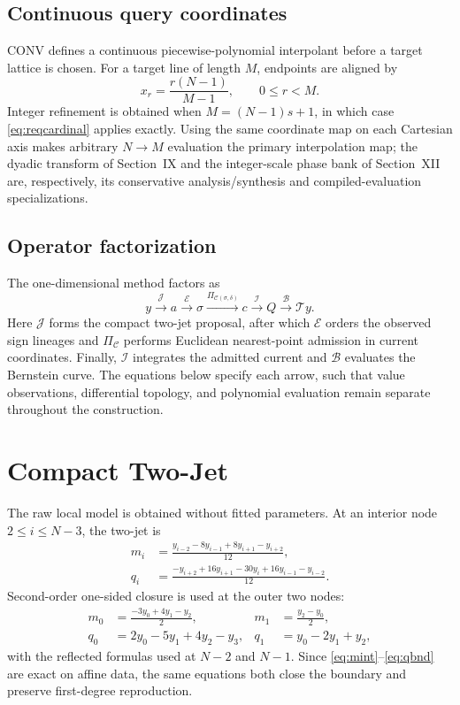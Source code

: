 \documentclass[journal]{IEEEtran}
\newcommand{\Tcal}{\mathcal{T}}
\newcommand{\Ccal}{\mathcal{C}}
\begin{document}
\subsection{Continuous query coordinates}

CONV defines a continuous piecewise-polynomial interpolant before a target
lattice is chosen. For a target line of length \(M\), endpoints are aligned
by
\begin{equation}
 x_r=\frac{r(N-1)}{M-1},\qquad 0\leq r<M.
 \label{eq:targetmap}
\end{equation}
Integer refinement is obtained when \(M=(N-1)s+1\), in which case
\eqref{eq:reqcardinal} applies exactly. Using the same coordinate map on each
Cartesian axis makes arbitrary \(N\to M\) evaluation the primary
interpolation map; the dyadic transform of Section~IX and the integer-scale
phase bank of Section~XII are, respectively, its conservative
analysis/synthesis and compiled-evaluation specializations.

\subsection{Operator factorization}

The one-dimensional method factors as
\begin{equation}
 y\xrightarrow{\mathcal J}a
 \xrightarrow{\mathcal E}\sigma
 \xrightarrow{\Pi_{\Ccal(\sigma,\delta)}}c
 \xrightarrow{\mathcal I}Q
 \xrightarrow{\mathcal B}\Tcal y.
 \label{eq:pipeline}
\end{equation}
Here \(\mathcal J\) forms the compact two-jet proposal, after which
\(\mathcal E\) orders the observed sign lineages and \(\Pi_{\Ccal}\)
performs Euclidean nearest-point admission in current coordinates. Finally,
\(\mathcal I\) integrates the admitted current and \(\mathcal B\) evaluates
the Bernstein curve. The equations below specify each arrow, such that value
observations, differential topology, and polynomial evaluation remain
separate throughout the construction.

\section{Compact Two-Jet}

The raw local model is obtained without fitted parameters. At an interior
node \(2\leq i\leq N-3\), the two-jet is
\begin{align}
 m_i&=\frac{y_{i-2}-8y_{i-1}+8y_{i+1}-y_{i+2}}{12}, \label{eq:mint}\\
 q_i&=\frac{-y_{i+2}+16y_{i+1}-30y_i+16y_{i-1}-y_{i-2}}{12}.
 \label{eq:qint}
\end{align}
Second-order one-sided closure is used at the outer two nodes:
\begin{align}
 m_0&=\frac{-3y_0+4y_1-y_2}{2},&
 m_1&=\frac{y_2-y_0}{2}, \label{eq:mbnd}\\
 q_0&=2y_0-5y_1+4y_2-y_3,&
 q_1&=y_0-2y_1+y_2, \label{eq:qbnd}
\end{align}
with the reflected formulas used at \(N-2\) and \(N-1\). Since
\eqref{eq:mint}--\eqref{eq:qbnd} are exact on affine data, the same equations
both close the boundary and preserve first-degree reproduction.
\end{document}

